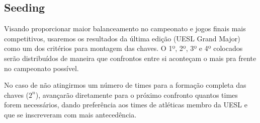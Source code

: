 \subsection{Seeding}

Visando proporcionar maior balanceamento no campeonato e jogos finais mais competitivos, usaremos os resultados da última edição (UESL Grand Major) como um dos critérios para montagem das chaves. O 1º, 2º, 3º e 4º colocados serão distribuídos de maneira que confrontos entre si aconteçam o mais pra frente no campeonato possível.

No caso de não atingirmos um número de times para a formação completa das chaves (\(2^n\)), avançarão diretamente para o próximo confronto quantos times forem necessários, dando preferência aos times de atléticas membro da UESL e que se inscreveram com mais antecedência.
